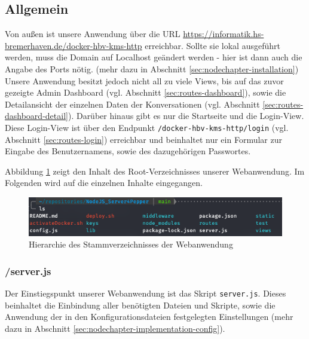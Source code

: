 \subsection{Allgemein}
Von außen ist unsere Anwendung über die URL
\href{https://informatik.hs-bremerhaven.de/docker-hbv-kms-http}{https://informatik.hs-bremerhaven.de/docker-hbv-kms-http}
erreichbar. Sollte sie lokal ausgeführt werden, muss die Domain auf Localhost geändert werden - hier ist dann auch die Angabe
des Ports nötig. (mehr dazu in Abschnitt \ref{sec:nodechapter-installation})\\


Unsere Anwendung besitzt jedoch nicht all zu viele Views, bis auf das zuvor gezeigte Admin Dashboard (vgl. Abschnitt \ref{sec:routes-dashboard}), sowie
die Detailansicht der einzelnen Daten der Konversationen (vgl. Abschnitt \ref{sec:routes-dashboard-detail}). Darüber hinaus gibt es nur
die Startseite und die Login-View. Diese Login-View ist über den Endpunkt \verb|/docker-hbv-kms-http/login|
(vgl. Abschnitt \ref{sec:routes-login}) erreichbar und beinhaltet nur ein Formular zur Eingabe des
Benutzernamens, sowie des dazugehörigen Passwortes.


Abbildung \ref{fig:webhierarchie} zeigt den Inhalt des Root-Verzeichnisses unserer Webanwendung.
Im Folgenden wird auf die einzelnen Inhalte eingegangen. \\

\begin{figure}[H]
    \includegraphics[width=\textwidth]{Figures/NodeChapter/ServerFileStructure.png}
    \caption{Hierarchie des Stammverzeichnisses der Webanwendung}
    \label{fig:webhierarchie}
    \centering
\end{figure}

\subsubsection*{/server.js}
Der Einstiegspunkt unserer Webanwendung ist das Skript \verb|server.js|. Dieses beinhaltet die Einbindung aller
benötigten Dateien und Skripte, sowie die Anwendung der in den Konfigurationsdateien festgelegten Einstellungen
(mehr dazu in Abschnitt \ref{sec:nodechapter-implementation-config}).

